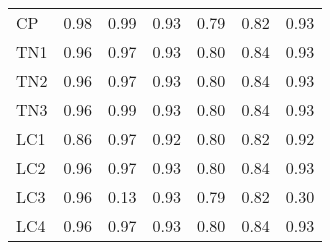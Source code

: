 \documentclass[./dissertation.tex]{subfiles}
\begin{document}
\begin{table}
\begin{tabular}{|l|c|c|c|c|c|c|}
        CP                                        & 0.98                                    & 0.99                                        & 0.93                                    & 0.79                                  & 0.82                                   & 0.93                                    \\
        TN1                                       & 0.96                                    & 0.97                                        & 0.93                                    & 0.80                                  & 0.84                                   & 0.93                                    \\
        TN2                                       & 0.96                                    & 0.97                                        & 0.93                                    & 0.80                                  & 0.84                                   & 0.93                                    \\
        TN3                                       & 0.96                                    & 0.99                                        & 0.93                                    & 0.80                                  & 0.84                                   & 0.93                                    \\
        LC1                                       & 0.86                                    & 0.97                                        & 0.92                                    & 0.80                                  & 0.82                                   & 0.92                                    \\
        LC2                                       & 0.96                                    & 0.97                                        & 0.93                                    & 0.80                                  & 0.84                                   & 0.93                                    \\
        LC3                                       & 0.96                                    & 0.13                                        & 0.93                                    & 0.79                                  & 0.82                                   & 0.30                                    \\
        LC4                                       & 0.96                                    & 0.97                                        & 0.93                                    & 0.80                                  & 0.84                                   & 0.93                                    \\

\end{tabular}
\end{table}
\end{document}
